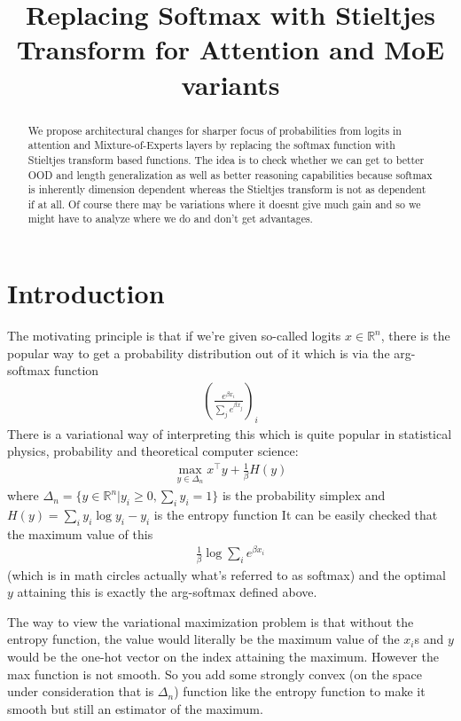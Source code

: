 \documentclass{article}
\title{Replacing Softmax with Stieltjes Transform for Attention and MoE variants}
\begin{document}
\maketitle

\begin{abstract}
We propose architectural changes for sharper focus of probabilities from logits in attention and Mixture-of-Experts layers by replacing the softmax function with Stieltjes transform based functions. The idea is to check whether we can get to better OOD and length generalization as well as better reasoning capabilities because softmax is inherently dimension dependent whereas the Stieltjes transform is not as dependent if at all. Of course there may be variations where it doesnt give much gain and so we might have to analyze where we do and don't get advantages. 
\end{abstract}

\section{Introduction}
The motivating principle is that if we're given so-called logits $x\in\mathbb{R}^n$, there is the popular way to get a probability distribution out of it which is via the arg-softmax function \begin{align*}\left(\frac{e^{\beta x_i}}{\sum\limits_j e^{\beta x_j}} \right)_i\end{align*}
There is a variational way of interpreting this which is quite popular in statistical physics, probability and theoretical computer science: 
\begin{align*}
\max_{y \in \Delta_n} x^\top y + \frac{1}{\beta}H(y)
\end{align*}
where $\Delta_n = \{y\in \mathbb{R}^n \vert y_i \geq 0 , \sum\limits_i y_i = 1\}$ is the probability simplex and $H(y) = \sum\limits_i y_i \log y_i - y_i $ is the entropy function
It can be easily checked that the maximum value of this \begin{align*}\frac{1}{\beta}\log \sum\limits_i e^{\beta x_i}\end{align*} (which is in math circles actually what's referred to as softmax) and the optimal $y$ attaining this is exactly the arg-softmax defined above.

The way to view the variational maximization problem is that without the entropy function, the value would literally be the maximum value of the $x_i$s and $y$ would be the one-hot vector on the index attaining the maximum. However the max function is not smooth. So you add some strongly convex (on the space under consideration that is $\Delta_n$) function like the entropy function to make it smooth but still an estimator of the maximum. 
\end{document}
